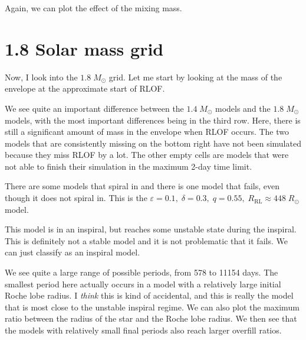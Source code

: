 \documentclass[a4paper,10pt]{article}
\begin{document}
Again, we can plot the effect of the mixing mass.
\begin{figure}[ht]
	\centering
\end{figure}

\section{1.8 Solar mass grid}

Now, I look into the \(1.8\; M_\odot \) grid.
Let me start by looking at the mass of the envelope
at the approximate start of RLOF.

\begin{figure}[ht]
	\centering
\end{figure}

\nextpage
We see quite an important difference between the \(1.4\; M_\odot \) models and the \(1.8\; M_\odot \) models, with the most important differences being in the third row.
Here, there is still a significant amount of mass in the envelope when RLOF occurs.
The two models that are consistently missing on the bottom right have not been simulated because
they miss RLOF by a lot.
The other empty cells are models that were not able to finish their
simulation in the maximum 2-day time limit.

There are some models that spiral in and there is one model that fails, even though it does
not spiral in.
This is the \(\varepsilon =0.1,\; \delta =0.3,\; q=0.55,\; R_\text{RL} \approx 448\; R_\odot \) model.

This model is in an inspiral, but reaches some unstable state during the inspiral.
This
is definitely not a stable model and it is not problematic that it fails.
We can just classify
as an inspiral model.

\begin{figure}[ht]
	\centering
\end{figure}

We see quite a large range of possible periods, from 578 to 11154 days.
The smallest period here actually occurs in a model with a relatively large initial Roche
lobe radius.
I \emph{think} this is kind of accidental, and this is really the
model that is most close to the unstable inspiral regime.
We can also plot the maximum ratio between the radius of the star and the Roche lobe radius.
We then
see that the models with relatively small final periods also reach larger overfill ratios.
\end{document}
